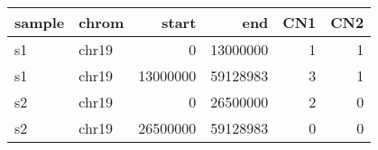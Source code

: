 \documentclass{standalone}
\begin{document}
\begin{tabular}{llrrrr}
\toprule
sample & chrom & start & end & CN1 & CN2 \\
\midrule
s1 & chr19 & 0 & 13000000 & 1 & 1 \\
s1 & chr19 & 13000000 & 59128983 & 3 & 1 \\
s2 & chr19 & 0 & 26500000 & 2 & 0 \\
s2 & chr19 & 26500000 & 59128983 & 0 & 0 \\
\bottomrule
\end{tabular}
\end{document}
